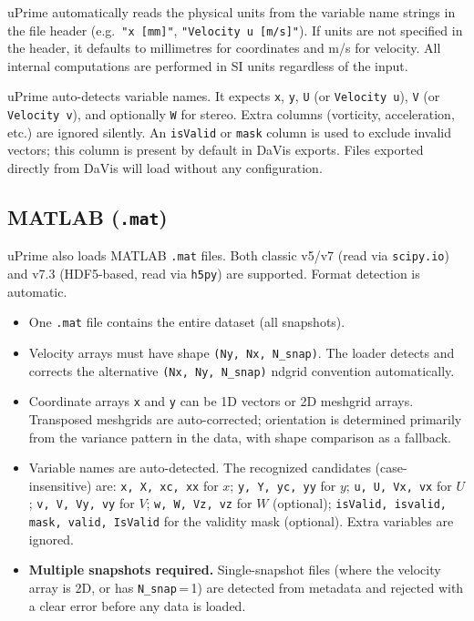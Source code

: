 \documentclass[11pt, a4paper]{report}
\newcommand{\software}[1]{\textsf{#1}}
\begin{document}
\software{uPrime} automatically reads the physical units from the variable name strings in the file header (e.g.\ \texttt{"x [mm]"}, \texttt{"Velocity u [m/s]"}). If units are not specified in the header, it defaults to millimetres for coordinates and m/s for velocity. All internal computations are performed in SI units regardless of the input.

\begin{notebox}
\software{uPrime} auto-detects variable names. It expects \texttt{x}, \texttt{y}, \texttt{U} (or \texttt{Velocity u}), \texttt{V} (or \texttt{Velocity v}), and optionally \texttt{W} for stereo. Extra columns (vorticity, acceleration, etc.) are ignored silently. An \texttt{isValid} or \texttt{mask} column is used to exclude invalid vectors; this column is present by default in DaVis exports. Files exported directly from DaVis will load without any configuration.
\end{notebox}

\subsection{MATLAB (\texttt{.mat})}
\label{sec:matformat}

\software{uPrime} also loads MATLAB \texttt{.mat} files. Both classic v5/v7 (read via \texttt{scipy.io}) and v7.3 (HDF5-based, read via \texttt{h5py}) are supported. Format detection is automatic.

\begin{itemize}[leftmargin=1.5em]
  \item One \texttt{.mat} file contains the entire dataset (all snapshots).
  \item Velocity arrays must have shape \texttt{(Ny, Nx, N\_snap)}. The loader detects and corrects the alternative \texttt{(Nx, Ny, N\_snap)} ndgrid convention automatically.
  \item Coordinate arrays \texttt{x} and \texttt{y} can be 1D vectors or 2D meshgrid arrays. Transposed meshgrids are auto-corrected; orientation is determined primarily from the variance pattern in the data, with shape comparison as a fallback.
  \item Variable names are auto-detected. The recognized candidates (case-insensitive) are: \texttt{x, X, xc, xx} for $x$; \texttt{y, Y, yc, yy} for $y$; \texttt{u, U, Vx, vx} for $U$; \texttt{v, V, Vy, vy} for $V$; \texttt{w, W, Vz, vz} for $W$ (optional); \texttt{isValid, isvalid, mask, valid, IsValid} for the validity mask (optional). Extra variables are ignored.
  \item \textbf{Multiple snapshots required.} Single-snapshot files (where the velocity array is 2D, or has \texttt{N\_snap}\,=\,1) are detected from metadata and rejected with a clear error before any data is loaded.
\end{itemize}
\end{document}
